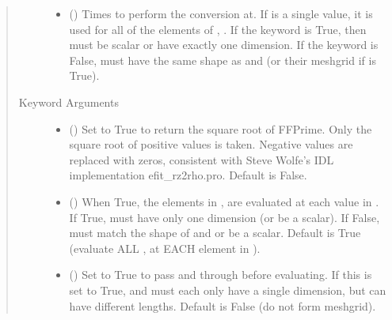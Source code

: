 \documentclass[letterpaper,10pt,english]{sphinxmanual}
\begin{document}
\begin{fulllineitems}
\begin{fulllineitems}
\begin{quote}
\begin{description}
\begin{itemize}
\item {} 
 () \textendash{} Times to perform the conversion at.
If  is a single value, it is used for all of the elements of
, . If the  keyword is True, then  must be
scalar or have exactly one dimension. If the  keyword is
False,  must have the same shape as  and  (or their
meshgrid if  is True).

\end{itemize}

\item[{Keyword Arguments}] \leavevmode\begin{itemize}
\item {} 
 () \textendash{} Set to True to return the square root of FFPrime.
Only the square root of positive values is taken. Negative
values are replaced with zeros, consistent with Steve Wolfe’s
IDL implementation efit\_rz2rho.pro. Default is False.

\item {} 
 () \textendash{} When True, the elements in ,  are evaluated
at each value in . If True,  must have only one dimension
(or be a scalar). If False,  must match the shape of  and
 or be a scalar. Default is True (evaluate ALL ,  at
EACH element in ).

\item {} 
 () \textendash{} Set to True to pass  and  through
 before evaluating. If this is set to
True,  and  must each only have a single dimension, but
can have different lengths. Default is False (do not form
meshgrid).


\end{itemize}
\end{description}
\end{quote}
\end{fulllineitems}
\end{fulllineitems}
\end{document}

